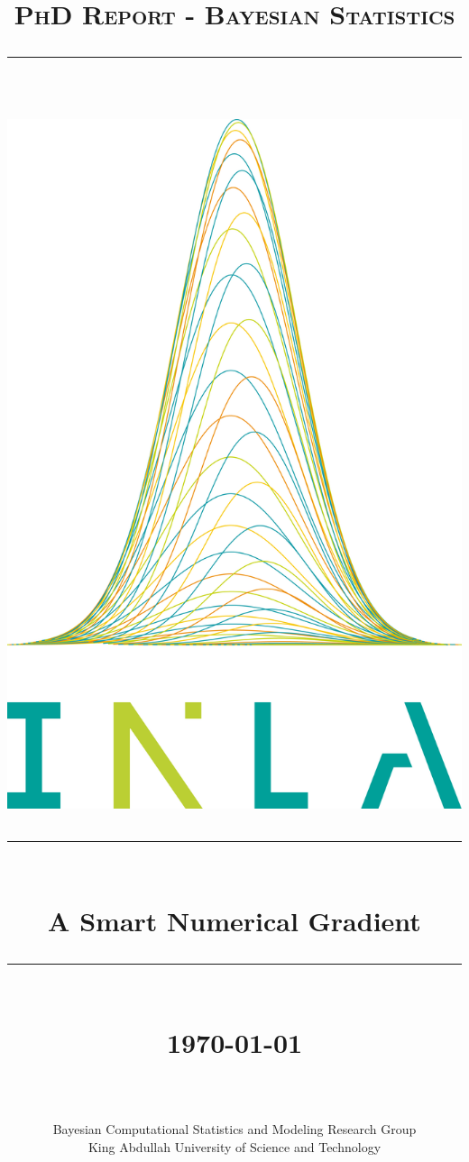 \documentclass{article}
\newcommand{\HRule}[1]{\rule{\linewidth}{#1}}
\begin{document}
	
		
	\title{ \normalsize \textsc{PhD Report - Bayesian Statistics}
		\\ [2.0cm]
		\HRule{0.5pt} \\
		\includegraphics[scale=0.2]{data/inlalogo.png}
		\HRule{0.5pt} \\ [0.5cm]
		\Large \textbf{A Smart Numerical Gradient}
		\HRule{0.5pt} \\ [0.5cm]
		\normalsize \today \vspace*{5\baselineskip}}
	
	\date{}
	
	\author{
    \\ \\
    Bayesian Computational Statistics and Modeling Research Group\\
		King Abdullah University of Science and Technology}
	
\end{document}
